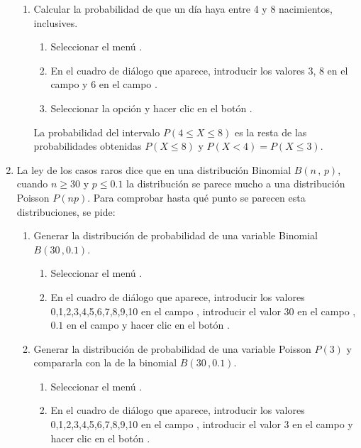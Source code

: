 \begin{enumerate}[leftmargin=*]
\begin{enumerate}
\item Calcular la probabilidad de que un día haya entre 4 y 8 nacimientos, inclusives.
\begin{indicacion}{
\begin{enumerate}
\item Seleccionar el menú .
\item En el cuadro de diálogo que aparece, introducir los valores 3, 8 en el campo  y
6 en el campo .
\item Seleccionar la opción  y hacer clic en el botón .
\end{enumerate}
La probabilidad del intervalo $P(4\leq X\leq 8)$ es la resta de las probabilidades obtenidas $P(X\leq 8)$ y $P(X<4)=P(X\leq 3)$.
}
\end{indicacion}
\end{enumerate}


\item La ley de los casos raros dice que en una distribución Binomial $B(n\,,\,p)$, cuando $n\geq 30$ y $p\leq
0.1$ la distribución se parece mucho a una distribución Poisson $P(np)$. 
Para comprobar hasta qué punto se parecen esta distribuciones, se pide:
\begin{enumerate}
\item Generar la distribución de probabilidad de una variable Binomial $B(30\,,0.1)$.
\begin{indicacion}{
\begin{enumerate}
\item Seleccionar el menú .
\item En el cuadro de diálogo que aparece, introducir los valores 0,1,2,3,4,5,6,7,8,9,10 en el campo , introducir el valor 30 en el campo , $0.1$ en el campo  y hacer clic en el botón .
\end{enumerate}}
\end{indicacion}

\item Generar la distribución de probabilidad de una variable Poisson $P(3)$ y compararla con la de la binomial
$B(30\,,0.1)$.
\begin{indicacion}{
\begin{enumerate}
\item Seleccionar el menú .
\item En el cuadro de diálogo que aparece, introducir los valores 0,1,2,3,4,5,6,7,8,9,10 en el campo , introducir el valor 3 en el campo  y hacer clic en el botón .
\end{enumerate}}
\end{indicacion}


\end{enumerate}
\end{enumerate}
